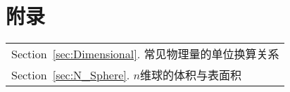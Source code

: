 \part{附录}\label{Part:Appendix}
	
	\begin{margintable}\vspace{1.4in}\footnotesize
		\begin{tabularx}{\marginparwidth}{|X}
		Section~\ref{sec:Dimensional}. 常见物理量的单位换算关系\\
		Section~\ref{sec:N_Sphere}. $n$维球的体积与表面积
		\end{tabularx}
	\end{margintable}

	


	


			